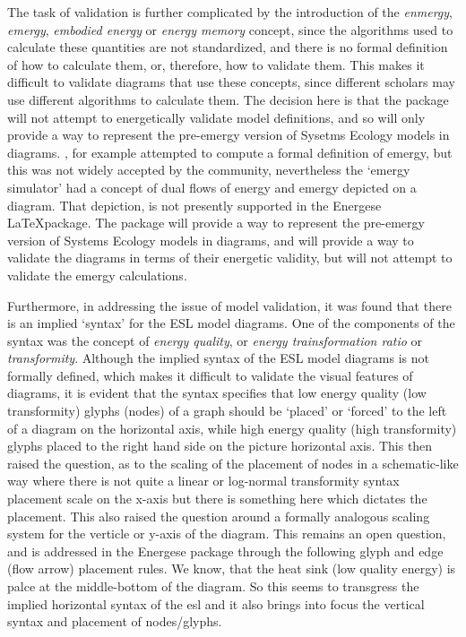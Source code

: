 The task of validation is further complicated by the introduction of the \textit{enmergy}, \textit{emergy}, \textit{embodied energy} or \textit{energy memory} concept, since the algorithms used to calculate these quantities are not standardized, and there is no formal definition of how to calculate them, or, therefore, how to validate them. This makes it difficult to validate diagrams that use these concepts, since different scholars may use different algorithms to calculate them. The decision here is that the package will not attempt to energetically validate model definitions, and so will only provide a way to represent the pre-emergy version of Sysetms Ecology models in diagrams. \cite{Valyai,Valyai}, for example attempted to compute a formal definition of emergy, but this was not widely accepted by the community, nevertheless the `emergy simulator' had a concept of dual flows of energy and emergy depicted on a diagram. That depiction, is not presently supported in the Energese \LaTeX package.  The package will provide a way to represent the pre-emergy version of Systems Ecology models in diagrams, and will provide a way to validate the diagrams in terms of their energetic validity, but will not attempt to validate the emergy calculations. 

Furthermore, in addressing the issue of model validation, it was found that there is an implied `syntax' for the ESL model diagrams. One of the components of the syntax was the concept of \textit{energy quality}, or \textit{energy trainsformation ratio} or \textit{transformity}. Although the implied syntax of the ESL model diagrams is not formally defined, which makes it difficult to validate the visual features of diagrams, it is evident that the syntax specifies that low energy quality (low transformity) glyphs (nodes) of a graph should be `placed' or `forced' to the left of a diagram on the horizontal axis, while high energy quality (high transformity) glyphs placed to the right hand side on the picture horizontal axis. This then raised the question, as to the scaling of the placement of nodes in a schematic-like way where there is not quite a linear or log-normal transformity syntax placement scale on the x-axis but there is something here which dictates the placement. This also raised the question around a formally analogous scaling system for the verticle or y-axis of the diagram. This remains an open question, and is addressed in the Energese package through the following glyph and edge (flow arrow) placement rules. We know, that the heat sink (low quality energy) is palce at the middle-bottom of the diagram. So this seems to transgress the implied horizontal syntax of the esl and it also brings into focus the vertical syntax and placement of nodes/glyphs. 

